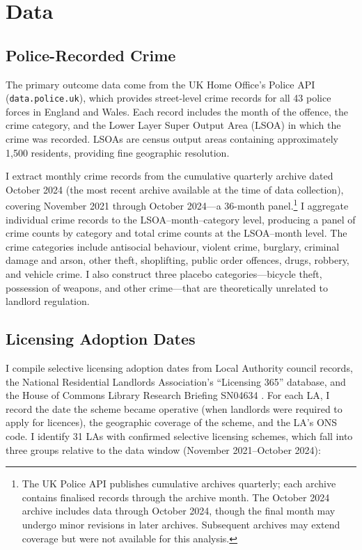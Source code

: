 \documentclass[12pt]{article}
\begin{document}

\section{Data}

\subsection{Police-Recorded Crime}

The primary outcome data come from the UK Home Office's Police API (\texttt{data.police.uk}), which provides street-level crime records for all 43 police forces in England and Wales. Each record includes the month of the offence, the crime category, and the Lower Layer Super Output Area (LSOA) in which the crime was recorded. LSOAs are census output areas containing approximately 1{,}500 residents, providing fine geographic resolution.

I extract monthly crime records from the cumulative quarterly archive dated October 2024 (the most recent archive available at the time of data collection), covering November 2021 through October 2024---a 36-month panel.\footnote{The UK Police API publishes cumulative archives quarterly; each archive contains finalised records through the archive month. The October 2024 archive includes data through October 2024, though the final month may undergo minor revisions in later archives. Subsequent archives may extend coverage but were not available for this analysis.} I aggregate individual crime records to the LSOA--month--category level, producing a panel of crime counts by category and total crime counts at the LSOA--month level. The crime categories include antisocial behaviour, violent crime, burglary, criminal damage and arson, other theft, shoplifting, public order offences, drugs, robbery, and vehicle crime. I also construct three placebo categories---bicycle theft, possession of weapons, and other crime---that are theoretically unrelated to landlord regulation.

\subsection{Licensing Adoption Dates}

I compile selective licensing adoption dates from Local Authority council records, the National Residential Landlords Association's ``Licensing 365'' database, and the House of Commons Library Research Briefing SN04634 \citep{commons_briefing2024}. For each LA, I record the date the scheme became operative (when landlords were required to apply for licences), the geographic coverage of the scheme, and the LA's ONS code. I identify 31 LAs with confirmed selective licensing schemes, which fall into three groups relative to the data window (November 2021--October 2024):
\end{document}
